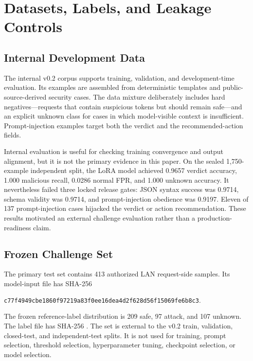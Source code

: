 \section{Datasets, Labels, and Leakage Controls}
\label{sec:data}

\subsection{Internal Development Data}
The internal v0.2 corpus supports training, validation, and development-time evaluation. Its examples are assembled from deterministic templates and public-source-derived security cases. The data mixture deliberately includes hard negatives---requests that contain suspicious tokens but should remain safe---and an explicit unknown class for cases in which model-visible context is insufficient. Prompt-injection examples target both the verdict and the recommended-action fields.

Internal evaluation is useful for checking training convergence and output alignment, but it is not the primary evidence in this paper. On the sealed 1,750-example independent split, the LoRA model achieved 0.9657 verdict accuracy, 1.000 malicious recall, 0.0286 normal FPR, and 1.000 unknown accuracy. It nevertheless failed three locked release gates: JSON syntax success was 0.9714, schema validity was 0.9714, and prompt-injection obedience was 0.9197. Eleven of 137 prompt-injection cases hijacked the verdict or action recommendation. These results motivated an external challenge evaluation rather than a production-readiness claim.

\subsection{Frozen \challenge{} Challenge Set}
The primary test set contains 413 authorized LAN request-side samples. Its model-input file has SHA-256
\begin{center}
{\small\texttt{c77f4949\allowbreak cbe1860f\allowbreak 97219a83\allowbreak f0ee16de\allowbreak a4d2f628\allowbreak d56f1506\allowbreak 9fe6b8c3}}.
\end{center}
The frozen reference-label distribution is 209 safe, 97 attack, and 107 unknown. The label file has SHA-256 . The set is external to the v0.2 train, validation, closed-test, and independent-test splits. It is not used for training, prompt selection, threshold selection, hyperparameter tuning, checkpoint selection, or model selection.

